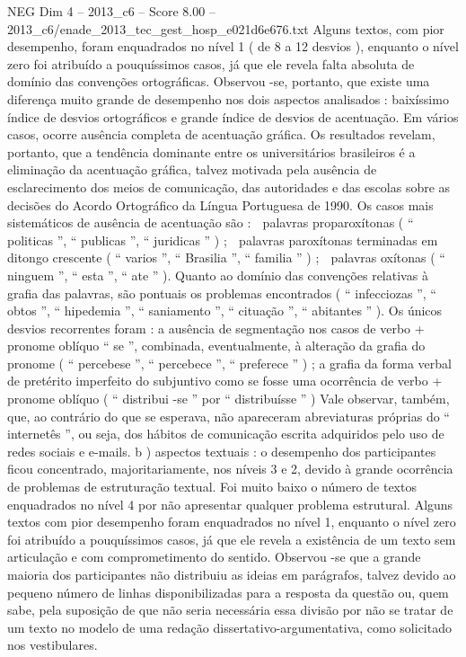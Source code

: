 \begin{textsample}{NEG Dim 4 – 2013\_c6 – Score 8.00 – 2013\_c6/enade\_2013\_tec\_gest\_hosp\_e021d6e676.txt}
Alguns textos, com pior desempenho, foram enquadrados no nível 1 ( de 8 a 12 desvios ), enquanto o nível zero foi atribuído a pouquíssimos casos, já que ele revela falta absoluta de domínio das convenções ortográficas.
Observou -se, portanto, que existe uma diferença muito grande de desempenho nos dois aspectos analisados : baixíssimo índice de desvios ortográficos e grande índice de desvios de acentuação.
Em vários casos, ocorre ausência completa de acentuação gráfica.
Os resultados revelam, portanto, que a tendência dominante entre os universitários brasileiros é a eliminação da acentuação gráfica, talvez motivada pela ausência de esclarecimento dos meios de comunicação, das autoridades e das escolas sobre as decisões do Acordo Ortográfico da Língua Portuguesa de 1990.
Os casos mais sistemáticos de ausência de acentuação são :  palavras proparoxítonas ( “ politicas ”, “ publicas ”, “ juridicas ” ) ;  palavras paroxítonas terminadas em ditongo crescente ( “ varios ”, “ Brasilia ”, “ familia ” ) ;  palavras oxítonas ( “ ninguem ”, “ esta ”, “ ate ” ).
Quanto ao domínio das convenções relativas à grafia das palavras, são pontuais os problemas encontrados ( “ infecciozas ”, “ obtos ”, “ hipedemia ”, “ saniamento ”, “ cituação ”, “ abitantes ” ).
Os únicos desvios recorrentes foram : a ausência de segmentação nos casos de verbo + pronome oblíquo “ se ”, combinada, eventualmente, à alteração da grafia do pronome ( “ percebese ”, “ percebece ”, “ preferece ” ) ; a grafia da forma verbal de pretérito imperfeito do subjuntivo como se fosse uma ocorrência de verbo + pronome oblíquo ( “ distribui -se ” por “ distribuísse ” ) Vale observar, também, que, ao contrário do que se esperava, não apareceram abreviaturas próprias do “ internetês ”, ou seja, dos hábitos de comunicação escrita adquiridos pelo uso de redes sociais e e-mails. b ) aspectos textuais : o desempenho dos participantes ficou concentrado, majoritariamente, nos níveis 3 e 2, devido à grande ocorrência de problemas de estruturação textual.
Foi muito baixo o número de textos enquadrados no nível 4 por não apresentar qualquer problema estrutural.
Alguns textos com pior desempenho foram enquadrados no nível 1, enquanto o nível zero foi atribuído a pouquíssimos casos, já que ele revela a existência de um texto sem articulação e com comprometimento do sentido.
Observou -se que a grande maioria dos participantes não distribuiu as ideias em parágrafos, talvez devido ao pequeno número de linhas disponibilizadas para a resposta da questão ou, quem sabe, pela suposição de que não seria necessária essa divisão por não se tratar de um texto no modelo de uma redação dissertativo-argumentativa, como solicitado nos vestibulares.

\end{textsample}
